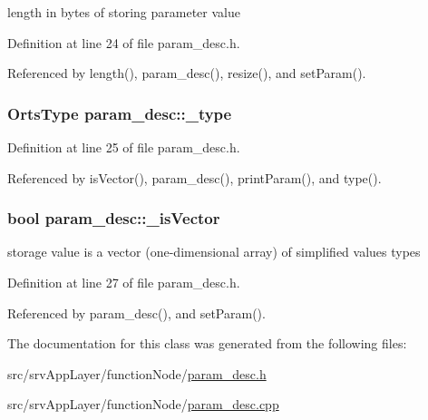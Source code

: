 length in bytes of storing parameter value 



Definition at line 24 of file param\_\-desc.h.



Referenced by length(), param\_\-desc(), resize(), and setParam().

\hypertarget{classparam__desc_abb36e4e2c3695b95a6a757fdb1a7e329}{
\subsubsection[{\_\-type}]{\setlength{\rightskip}{0pt plus 5cm}OrtsType {\bf param\_\-desc::\_\-type}}}
\label{d9/d42/classparam__desc_abb36e4e2c3695b95a6a757fdb1a7e329}


Definition at line 25 of file param\_\-desc.h.



Referenced by isVector(), param\_\-desc(), printParam(), and type().

\hypertarget{classparam__desc_ae7e4c24d35e3b990b53656ea964d77b5}{
\subsubsection[{\_\-isVector}]{\setlength{\rightskip}{0pt plus 5cm}bool {\bf param\_\-desc::\_\-isVector}}}
\label{d9/d42/classparam__desc_ae7e4c24d35e3b990b53656ea964d77b5}


storage value is a vector (one-\/dimensional array) of simplified values types 



Definition at line 27 of file param\_\-desc.h.



Referenced by param\_\-desc(), and setParam().



The documentation for this class was generated from the following files:\begin{DoxyCompactItemize}
\item 
src/srvAppLayer/functionNode/\hyperlink{param__desc_8h}{param\_\-desc.h}\item 
src/srvAppLayer/functionNode/\hyperlink{param__desc_8cpp}{param\_\-desc.cpp}\end{DoxyCompactItemize}
